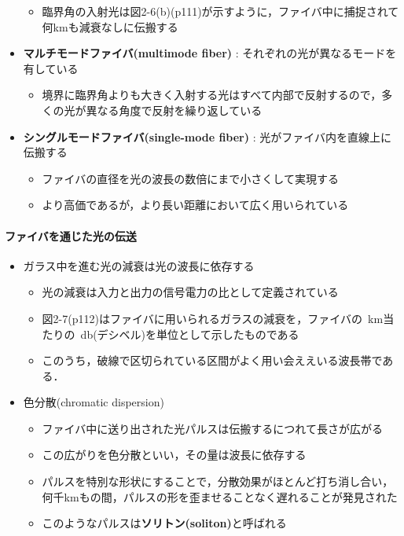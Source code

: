 \documentclass[a4paper]{ltjsarticle}
\begin{document}
\begin{itemize}
\begin{itemize}
					\item 臨界角の入射光は図2-6(b)(p111)が示すように，ファイバ中に捕捉されて何kmも減衰なしに伝搬する
				\end{itemize}
				\item \textbf{マルチモードファイバ(multimode fiber)} : それぞれの光が異なるモードを有している
				\begin{itemize}
					\item 境界に臨界角よりも大きく入射する光はすべて内部で反射するので，多くの光が異なる角度で反射を繰り返している
				\end{itemize}
				\item \textbf{シングルモードファイバ(single-mode fiber)} : 光がファイバ内を直線上に伝搬する
				\begin{itemize}
					\item ファイバの直径を光の波長の数倍にまで小さくして実現する
					\item より高価であるが，より長い距離において広く用いられている
				\end{itemize}
			\end{itemize}
			\paragraph{ファイバを通じた光の伝送}
				\begin{itemize}
					\item ガラス中を進む光の減衰は光の波長に依存する
					\begin{itemize}
						\item 光の減衰は入力と出力の信号電力の比として定義されている
						\item 図2-7(p112)はファイバに用いられるガラスの減衰を，ファイバの\SI{}{km}当たりの\SI{}{db}(デシベル)を単位として示したものである
						\item このうち，破線で区切られている区間がよく用い会ええいる波長帯である．
					\end{itemize}
					\item 色分散(chromatic dispersion)
					\begin{itemize}
						\item ファイバ中に送り出された光パルスは伝搬するにつれて長さが広がる
						\item この広がりを色分散といい，その量は波長に依存する
						\item パルスを特別な形状にすることで，分散効果がほとんど打ち消し合い，何千kmもの間，パルスの形を歪ませることなく遅れることが発見された
						\item このようなパルスは\textbf{ソリトン(soliton)}と呼ばれる
					\end{itemize}
				\end{itemize}
\end{document}
